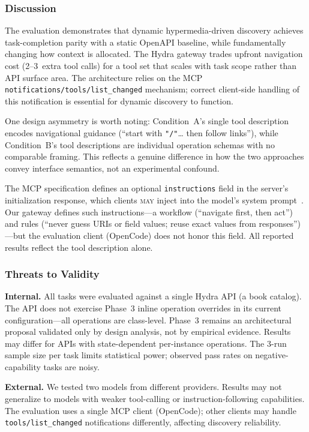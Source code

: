 \documentclass[11pt,a4paper]{article}
\begin{document}
\subsubsection{Discussion}

The evaluation demonstrates that dynamic hypermedia-driven discovery achieves task-completion parity with a static OpenAPI baseline, while fundamentally changing how context is allocated. The Hydra gateway trades upfront navigation cost (2--3~extra tool calls) for a tool set that scales with task scope rather than API surface area. The architecture relies on the MCP \texttt{notifications/tools/list\_changed} mechanism; correct client-side handling of this notification is essential for dynamic discovery to function.

One design asymmetry is worth noting: Condition~A's single tool description encodes navigational guidance (``start with \texttt{"/"}\ldots{} then follow links''), while Condition~B's tool descriptions are individual operation schemas with no comparable framing. This reflects a genuine difference in how the two approaches convey interface semantics, not an experimental confound.

The MCP specification defines an optional \texttt{instructions} field in the server's initialization response, which clients \textsc{may} inject into the model's system prompt~\cite{mcp-overview}. Our gateway defines such instructions---a workflow (``navigate first, then act'') and rules (``never guess URIs or field values; reuse exact values from responses'')---but the evaluation client (OpenCode) does not honor this field. All reported results reflect the tool description alone.

\subsubsection{Threats to Validity}

\textbf{Internal.} All tasks were evaluated against a single Hydra API (a book catalog). The API does not exercise Phase~3 inline operation overrides in its current configuration---all operations are class-level. Phase~3 remains an architectural proposal validated only by design analysis, not by empirical evidence. Results may differ for APIs with state-dependent per-instance operations. The 3-run sample size per task limits statistical power; observed pass rates on negative-capability tasks are noisy.

\textbf{External.} We tested two models from different providers. Results may not generalize to models with weaker tool-calling or instruction-following capabilities. The evaluation uses a single MCP client (OpenCode); other clients may handle \texttt{tools/list\_changed} notifications differently, affecting discovery reliability.
\end{document}
